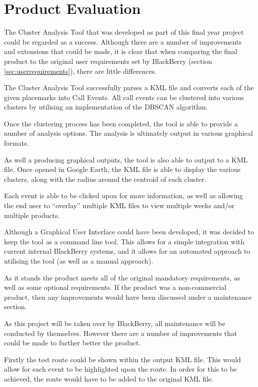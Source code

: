 \section{Product Evaluation}
\label{sec:product_evaluation}

The Cluster Analysis Tool that was developed as part of this final year project
could be regarded as a success. Although there are a number of improvements and
extensions that could be made, it is clear that when comparing the final 
product to the original user requirements set by BlackBerry (section 
\ref{sec:userrequirements}), there are little differences.

The Cluster Analysis Tool successfully parses a KML file and converts each of 
the given placemarks into Call Events. All call events can be clustered into 
various clusters by utilising an implementation of the DBSCAN algorithm.

Once the clustering process has been completed, the tool is able to provide a 
number of analysis options. The analysis is ultimately output in various 
graphical formats.

As well a producing graphical outputs, the tool is also able to output to a 
KML file. Once opened in Google Earth, the KML file is able to display the 
various clusters, along with the radius around the centroid of each cluster. 

Each event is able to be clicked upon for more information, as well as allowing
the end user to ``overlay'' multiple KML files to view multiple weeks and/or 
multiple products.

Although a Graphical User Interface could have been developed, it was decided 
to keep the tool as a command line tool. This allows for a simple integration
with current internal BlackBerry systems, and it allows for an automated 
approach to utilising the tool (as well as a manual approach).

As it stands the product meets all of the original mandatory requirements, 
as well as some optional requirements. If the product was a non-commercial 
product, then any improvements would have been discussed under a maintenance 
section. 

As this project will be taken over by BlackBerry, all maintenance will be 
conducted by themselves. However there are a number of improvements that could
be made to further better the product.

Firstly the test route could be shown within the output KML file. This would 
allow for each event to be highlighted upon the route. In order for this to be 
achieved, the route would have to be added to the original KML file. 


